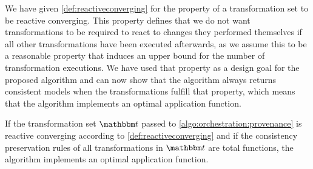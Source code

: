 We have given \autoref{def:reactiveconverging} for the property of a transformation set to be reactive converging.
This property defines that we do not want transformations to be required to react to changes they performed themselves if all other transformations have been executed afterwards, as we assume this to be a reasonable property that induces an upper bound for the number of transformation executions.
We have used that property as a design goal for the proposed algorithm and can now show that the algorithm always returns consistent models when the transformations fulfill that property, which means that the algorithm implements an optimal application function.

\begin{theorem}
    If the transformation set $\transformationset{T}$ passed to \autoref{algo:orchestration:provenance} is reactive converging according to \autoref{def:reactiveconverging} and if the consistency preservation rules of all transformations in $\transformationset{T}$ are total functions, the algorithm implements an optimal application function.
\end{theorem}
